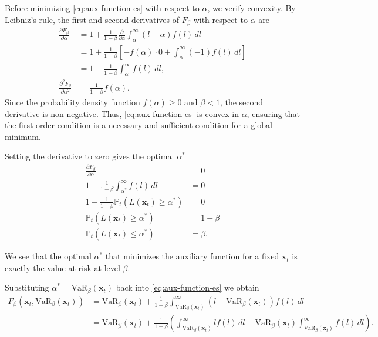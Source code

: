 Before minimizing \eqref{eq:aux-function-es} with respect to $\alpha$, we verify convexity. By Leibniz's rule, the first and second derivatives of $F_\beta$ with respect to $\alpha$ are
\begin{align*}
    \frac{\partial F_\beta}{\partial \alpha}
        &= 1 + \frac{1}{1-\beta} \frac{\partial}{\partial \alpha} \int_\alpha^\infty (l - \alpha) f(l) \, dl \\
    &= 1 + \frac{1}{1-\beta} \left[ -f(\alpha) \cdot 0 + \int_\alpha^\infty (-1) f(l) \, dl \right] \\
    &= 1 - \frac{1}{1-\beta} \int_{\alpha}^\infty f(l) \, dl, \\
    \frac{\partial^2 F_\beta}{\partial \alpha^2} &= \frac{1}{1-\beta} f(\alpha).
\end{align*}
Since the probability density function $f(\alpha) \ge 0$ and $\beta < 1$, the second derivative is non-negative. Thus, \eqref{eq:aux-function-es}  is convex in $\alpha$, ensuring that the first-order condition is a necessary and sufficient condition for a global minimum.


Setting the derivative to zero gives the optimal $\alpha^*$
\begin{align*}
    \frac{\partial F_\beta}{\partial \alpha} &= 0 \\
    1 - \frac{1}{1-\beta} \int_{\alpha^*}^\infty f(l) \, dl &= 0 \\
    1 - \frac{1}{1-\beta} \mathbb{P}_t(L(\bm{x}_t) \ge \alpha^*) &= 0 \\
    \mathbb{P}_t(L(\bm{x}_t) \ge \alpha^*) &= 1 - \beta \\
    \mathbb{P}_t(L(\bm{x}_t) \le \alpha^*) &= \beta.
\end{align*}

We see that the optimal $\alpha^*$ that minimizes the auxiliary function for a fixed $\bm{x}_t$ is exactly the value-at-risk at level $\beta$.

Substituting $\alpha^* = \text{VaR}_\beta(\bm{x}_t)$ back into \eqref{eq:aux-function-es} we obtain
\begin{align*}
    F_\beta(\bm{x}_t, \text{VaR}_\beta(\bm{x}_t)) &= \text{VaR}_\beta(\bm{x}_t) + \frac{1}{1-\beta} \int_{\text{VaR}_\beta(\bm{x}_t)}^\infty (l - \text{VaR}_\beta(\bm{x}_t)) f(l) \, dl \\
    &= \text{VaR}_\beta(\bm{x}_t) + \frac{1}{1-\beta} \left( \int_{\text{VaR}_\beta(\bm{x}_t)}^\infty l f(l) \, dl - \text{VaR}_\beta(\bm{x}_t) \int_{\text{VaR}_\beta(\bm{x}_t)}^\infty f(l) \, dl \right).
\end{align*}


